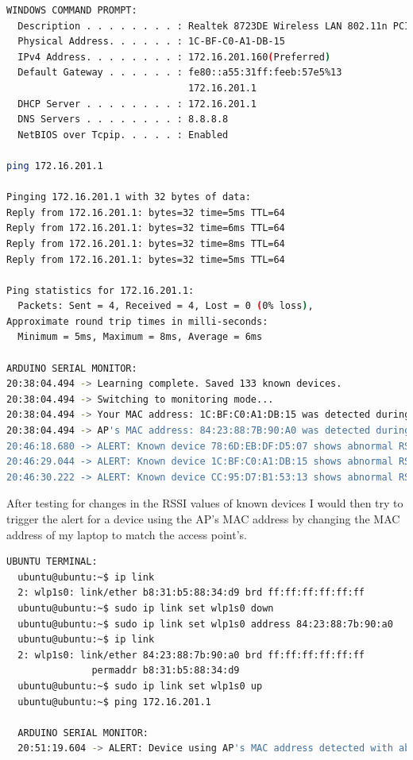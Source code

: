 \documentclass[letterpaper, 11pt]{article}
\begin{document}
\begin{lstlisting}[language=bash, caption=Testing Known Devices for Abnormal RSSI Values, label=lst:testing]
WINDOWS COMMAND PROMPT:
  Description . . . . . . . . : Realtek 8723DE Wireless LAN 802.11n PCI-E NIC
  Physical Address. . . . . . : 1C-BF-C0-A1-DB-15
  IPv4 Address. . . . . . . . : 172.16.201.160(Preferred)
  Default Gateway . . . . . . : fe80::a55:31ff:feeb:57e5%13
                                172.16.201.1
  DHCP Server . . . . . . . . : 172.16.201.1
  DNS Servers . . . . . . . . : 8.8.8.8
  NetBIOS over Tcpip. . . . . : Enabled

ping 172.16.201.1

Pinging 172.16.201.1 with 32 bytes of data:
Reply from 172.16.201.1: bytes=32 time=5ms TTL=64
Reply from 172.16.201.1: bytes=32 time=6ms TTL=64
Reply from 172.16.201.1: bytes=32 time=8ms TTL=64
Reply from 172.16.201.1: bytes=32 time=5ms TTL=64

Ping statistics for 172.16.201.1:
  Packets: Sent = 4, Received = 4, Lost = 0 (0% loss),
Approximate round trip times in milli-seconds:
  Minimum = 5ms, Maximum = 8ms, Average = 6ms

ARDUINO SERIAL MONITOR:
20:38:04.494 -> Learning complete. Saved 133 known devices.
20:38:04.494 -> Switching to monitoring mode...
20:38:04.494 -> Your MAC address: 1C:BF:C0:A1:DB:15 was detected during learning mode. RSSI: -37 dBm
20:38:04.494 -> AP's MAC address: 84:23:88:7B:90:A0 was detected during learning mode. RSSI: -69 dBm
20:46:18.680 -> ALERT: Known device 78:6D:EB:DF:D5:07 shows abnormal RSSI change! Current RSSI: -80 dBm, Known Avg RSSI: -59 dBm
20:46:29.044 -> ALERT: Known device 1C:BF:C0:A1:DB:15 shows abnormal RSSI change! Current RSSI: -58 dBm, Known Avg RSSI: -36 dBm
20:46:30.222 -> ALERT: Known device CC:95:D7:B1:53:13 shows abnormal RSSI change! Current RSSI: -77 dBm, Known Avg RSSI: -55 dBm
\end{lstlisting}

\newpage
 After testing for changes in the RSSI values of known devices I would then try to trigger the alert for a device using the AP's MAC address by changing the MAC address of my laptop to match the 
 access point's. 
 \begin{lstlisting}[language=bash, caption=Testing AP MAC Address with Large RSSI Variance, label=lst:testing2]
  UBUNTU TERMINAL:
  ubuntu@ubuntu:~$ ip link
  2: wlp1s0: link/ether b8:31:b5:88:34:d9 brd ff:ff:ff:ff:ff:ff
  ubuntu@ubuntu:~$ sudo ip link set wlp1s0 down
  ubuntu@ubuntu:~$ sudo ip link set wlp1s0 address 84:23:88:7b:90:a0
  ubuntu@ubuntu:~$ ip link
  2: wlp1s0: link/ether 84:23:88:7b:90:a0 brd ff:ff:ff:ff:ff:ff 
               permaddr b8:31:b5:88:34:d9
  ubuntu@ubuntu:~$ sudo ip link set wlp1s0 up
  ubuntu@ubuntu:~$ ping 172.16.201.1
  
  ARDUINO SERIAL MONITOR:
  20:51:19.604 -> ALERT: Device using AP's MAC address detected with abnormal RSSI! RSSI: -40 dBm
  \end{lstlisting}
\end{document}
